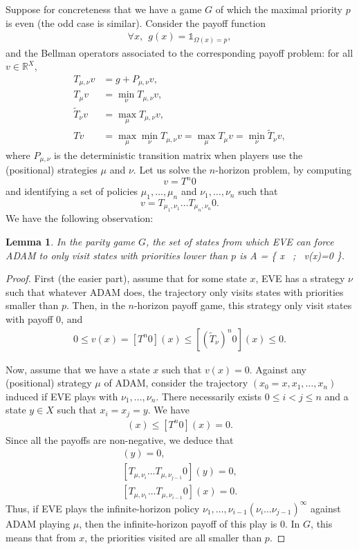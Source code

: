 \documentclass{article}
\newtheorem{lemma}{Lemma}
\def\1{{\mathds 1}}
\def\R{\mathbb R}
\begin{document}
Suppose for concreteness that we have a game $G$ of which the maximal priority $p$ is even (the odd case is similar).
Consider the payoff function
\begin{align}
  \forall x,~~ g(x) = \1_{\Omega(x)=p},
\end{align}
and the Bellman operators associated to the corresponding payoff problem: for all $v \in \R^X$,
\begin{align}
  T_{\mu,\nu} v &= g + P_{\mu,\nu}v, \\
  T_{\mu} v & = \min_\nu T_{\mu,\nu} v, \\
  \tilde T_{\nu} v & = \max_\mu T_{\mu,\nu} v, \\
   T v &= \max_\mu \min_\nu T_{\mu,\nu}v = \max_\mu T_\mu v = \min_\nu \tilde T_\nu v,
\end{align}
where $P_{\mu,\nu}$ is the deterministic transition matrix when players use the (positional) strategies $\mu$ and $\nu$.
Let us solve the $n$-horizon problem, by computing
$$
v=T^n 0
$$
and identifying a set of policies $\mu_1,\dots,\mu_n$ and $\nu_1,\dots,\nu_n$ such that
$$
v = T_{\mu_1,\nu_1} \dots T_{\mu_n,\nu_n} 0.
$$
We have the following observation:
\begin{lemma}
  In the parity game $G$, the set of states from which EVE can force ADAM to \emph{only} visit states with priorities lower than $p$ is
  A = \{ x ~;~ v(x)=0 \}.
\end{lemma}
\begin{proof}
  First (the easier part), assume that for some state $x$, EVE has a strategy $\nu$ such that whatever ADAM does, the trajectory only visits states with priorities smaller than $p$. Then, in the $n$-horizon payoff game, this strategy only visit states with payoff $0$, and 
  \begin{align}
   0 \le v(x) =  [T^n0](x) \le [(\tilde T_{\nu})^n 0](x) \le 0.
  \end{align}

  Now, assume that we have a state $x$ such that $v(x)=0$. Against any (positional) strategy $\mu$ of ADAM, consider the trajectory $(x_0=x,x_1,\dots,x_n)$ induced if EVE plays with $\nu_1,\dots,\nu_n$. There necessarily exists $0 \le i<j\le n$ and a state $y \in X$ such that $x_i=x_j=y$. We have
  \begin{align}
    [T_{\mu,\nu_1} \dots T_{\mu,\nu_{i-1}} T_{\mu,\nu_i} \dots T_{\mu,\nu_{j-1}} T^{n-j}0](x) \le [T^n0](x) = 0.
  \end{align}
  Since all the payoffs are non-negative, we deduce that
  \begin{align}
    [T^{n-j}0](y)=0, \\
    [T_{\mu,\nu_i} \dots T_{\mu,\nu_{j-1}} 0](y)=0, \\
    [T_{\mu,\nu_1} \dots T_{\mu,\nu_{i-1}} 0](x)=0.
  \end{align}
  Thus, if EVE plays the infinite-horizon policy $\nu_1,\dots,\nu_{i-1}(\nu_i \dots \nu_{j-1})^\infty$ against ADAM playing $\mu$, then the infinite-horizon payoff of this play is $0$. In $G$, this means that from $x$, the priorities visited are all smaller than $p$.
\end{proof}
\end{document}
